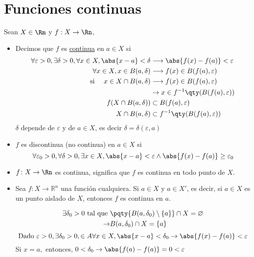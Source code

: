 \section{Funciones continuas}

Sean $X \in \Rm$ y $f : X \rightarrow \Rn$,
\begin{itemize}
	\item  Decimos que $f$ es \underline{continua} en $a\in X$ si
	      \begin{align*}
		      \forall \varepsilon >0, \exists \delta >0, \forall x \in X, \abs{x-a}<\delta & \longrightarrow \abs{f(x)-f(a)}<\varepsilon       \\
		      \forall x \in X, x\in B(a, \delta)                                           & \longrightarrow f(x) \in B(f(a), \varepsilon)     \\
		      \text{si }\quad x \in X \cap B(a, \delta)                                    & \longrightarrow f(x) \in B(f(a), \varepsilon)     \\
		                                                                                   & \rightarrow x \in f^{-1}\qty(B(f(a),\varepsilon)) \\
		      f(X\cap B(a, \delta ))                                                       & \subset B(f(a), \varepsilon)                      \\
		      X\cap B(a, \delta )                                                          & \subset f^{-1}\qty(B(f(a), \varepsilon))
	      \end{align*}
	      $\delta$ depende de $\varepsilon$ y de $a \in X$, es decir $\delta=\delta(\varepsilon, a)$
	\item $f$ es discontinua (no continua) en $a\in X$ si
	      $$
		      \forall \varepsilon_0 >0, \forall \delta>0, \exists x \in X, \abs{x-a}<\varepsilon \wedge \abs{f(x)-f(a)} \geq \varepsilon_0
	      $$
	\item $f \colon X \to \Rn$ es continua, significa que $f$ es continua en todo punto de $X$.

	\item Sea \( f \colon X \to \mathbb{R}^n \) una función cualquiera. Si $a \in X$ y $a \in X'$, es decir,  si \( a \in X \) es un punto aislado de \( X \), entonces \( f \) es continua en \( a \).

	      \begin{align*}
		      \exists \delta_0>0 \text{ tal que } & \pqty{B(a, \delta_0) \setminus\{a\}}\cap X = \varnothing \\
		      \to                                 & B(a, \delta_0) \cap X =\{a\}
	      \end{align*}
	      $$
		      \text{Dado } \varepsilon>0, \exists \delta_0>0, \in A  \forall x \in X, \abs{x-a} < \delta_0 \rightarrow \abs{f(x)-f(a)}<\varepsilon
	      $$
	      Si $x=a,$ entonces, $ 0<\delta_0 \rightarrow \abs{f(a)-f(a)}=0 < \varepsilon$


\end{itemize}
